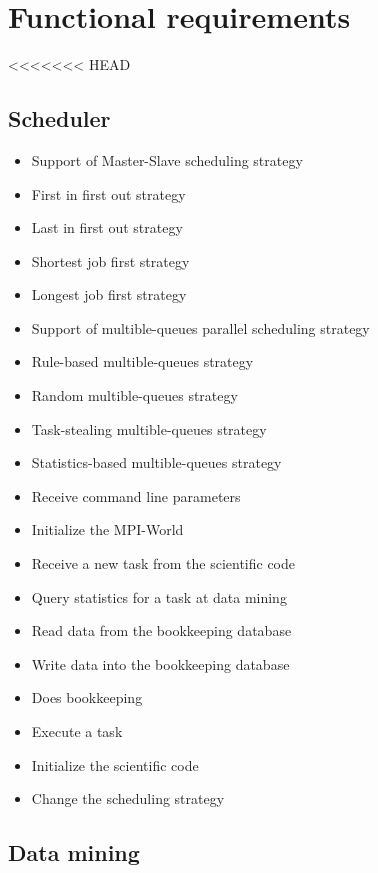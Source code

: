 {


\setcounter{func}{10}
\renewcommand{\labelitemi}{
	\ifnum \value{func}<10$/F 0\arabic{func} /$\addtocounter{func}{10}
	\else $/F \arabic{func} /$\addtocounter{func}{10}\fi
	}

\section{Functional requirements} 
<<<<<<< HEAD
	
	\subsection{Scheduler}
	
		\begin{itemize}
			\item Support of Master-Slave scheduling strategy
			\item First in first out strategy
			\item Last in first out strategy
			\item Shortest job first strategy
			\item Longest job first strategy 
			\item Support of multible-queues parallel scheduling strategy
			\item Rule-based multible-queues strategy
			\item Random multible-queues strategy
			\item Task-stealing multible-queues strategy
			\item Statistics-based multible-queues strategy
			\item Receive command line parameters
			\item Initialize the MPI-World 
			\item Receive a new task from the scientific code
			\item Query statistics for a task at data mining
			\item Read data from the bookkeeping database
			\item Write data into the bookkeeping database
			\item Does bookkeeping
			\item Execute a task
			\item Initialize the scientific code
			\item Change the scheduling strategy
		\end{itemize}
	
	
	\subsection{Data mining}
	
}
